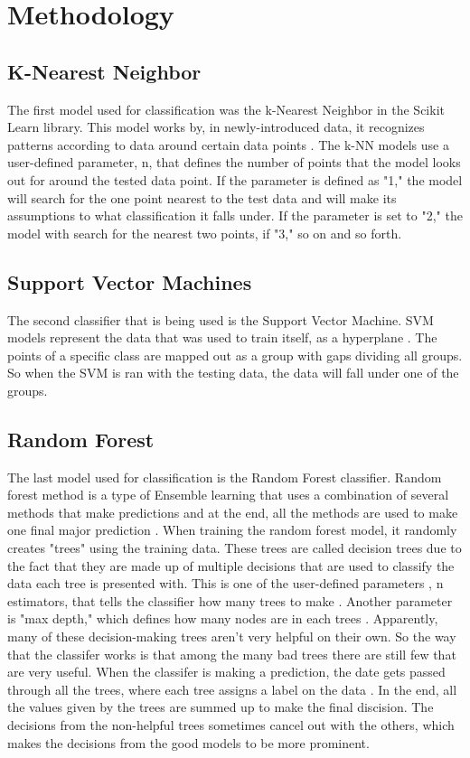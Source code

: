 \documentclass{report}
\begin{document}
\section{Methodology}
\subsection{K-Nearest Neighbor}
The first model used for classification was the k-Nearest Neighbor in the Scikit Learn library. 
This model works by, in newly-introduced data, it recognizes patterns according to data around certain data points \cite{random}. The k-NN models use a user-defined 
parameter, n, that defines the number of points that the model looks out for around the tested data point. If the parameter is defined as "1," the model will search 
for the one point nearest to the test data and will make its assumptions to what classification it falls under. If the parameter is set to "2," the model with 
search for the nearest two points, if "3," so on and so forth.  

\subsection{Support Vector Machines}
The second classifier that is being used is the Support Vector Machine. SVM models represent the data that was used to train itself, as a hyperplane \cite{classsvm}. 
The points of a specific class are mapped out as a group with gaps dividing all groups. So when the SVM is ran with the testing data, the data will fall under one of the 
groups. 


\subsection{Random Forest}
The last model used for classification is the Random Forest classifier. Random forest method is a type of Ensemble learning that uses a combination of several methods 
that make predictions and at the end, all the methods are used to make one final major 
prediction \cite{random}. When training the random forest model, it randomly creates "trees" using the training data. 
These trees are called decision trees due to the fact that they are made up of multiple decisions 
that are used to classify the data each tree is presented with. This is one of the user-defined parameters , n estimators, that tells the classifier how many trees 
to make \cite{skforest}. Another parameter is "max depth," which defines how many nodes are in each trees \cite{skforest}. Apparently, many of these decision-making 
trees aren't very helpful on their own. So the way that the classifer works is that among the many bad 
trees there are still few that are very useful. When the classifer is making a prediction, 
the date gets passed through all the trees, where each tree assigns a label on the data \cite{random}. In the end, all the values 
given by the trees are summed up to make the final discision. The decisions from the non-helpful 
trees sometimes cancel out with the others, which makes the decisions from the good models to be more 
prominent.
\end{document}
